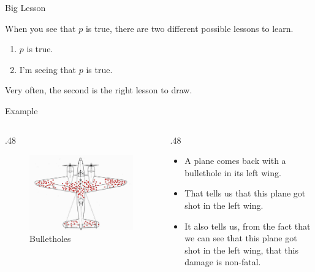 \documentclass[
  ignorenonframetext,
]{beamer}
\providecommand{\tightlist}{%
  \setlength{\itemsep}{0pt}\setlength{\parskip}{0pt}}
\renewcommand{\,}{\text{, }}
\def\begincols{\begin{columns}}
\def\begincol{\begin{column}}
\def\endcol{\end{column}}
\def\endcols{\end{columns}}
\begin{document}
\begin{frame}{Big Lesson}
\protect\hypertarget{big-lesson}{}

When you see that \(p\) is true, there are two different possible
lessons to learn.

\begin{enumerate}
\tightlist
\item
  \(p\) is true.
\item
  I'm seeing that \(p\) is true.
\end{enumerate}

Very often, the second is the right lesson to draw.

\end{frame}

\begin{frame}{Example}
\protect\hypertarget{example}{}

\begincols
\begincol{.48\textwidth}

\begin{figure}
\centering
\includegraphics{../images/class10/wald_plane.jpg}
\caption{Bulletholes}
\end{figure}

\endcol
\begincol{.48\textwidth}

\begin{itemize}
\tightlist
\item
  A plane comes back with a bullethole in its left wing.
\item
  That tells us that this plane got shot in the left wing.
\item
  It also tells us, from the fact that we can see that this plane got
  shot in the left wing, that this damage is non-fatal.
\end{itemize}

\endcol
\endcols

\end{frame}
\end{document}
